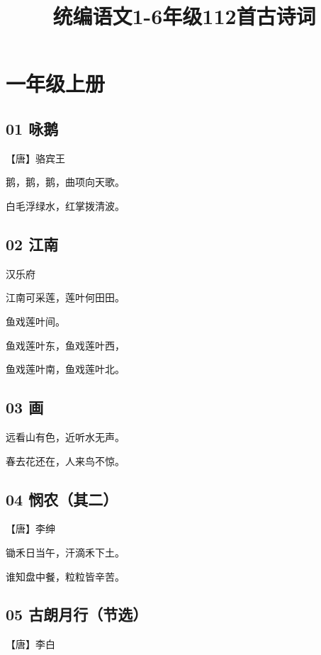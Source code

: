 \documentclass[12pt]{article}
\begin{document}
\title{统编语文1-6年级112首古诗词}
\author{}
\date{}

\maketitle


\centering

\section*{一年级上册}

\subsection*{01 咏鹅}

【唐】骆宾王

鹅，鹅，鹅，曲项向天歌。

白毛浮绿水，红掌拨清波。

\subsection*{02 江南}

汉乐府

江南可采莲，莲叶何田田。

鱼戏莲叶间。

鱼戏莲叶东，鱼戏莲叶西，

鱼戏莲叶南，鱼戏莲叶北。

\subsection*{03 画}

远看山有色，近听水无声。

春去花还在，人来鸟不惊。

\subsection*{04 悯农（其二）}

【唐】李绅

锄禾日当午，汗滴禾下土。

谁知盘中餐，粒粒皆辛苦。

\subsection*{05 古朗月行（节选）}

【唐】李白
\end{document}
